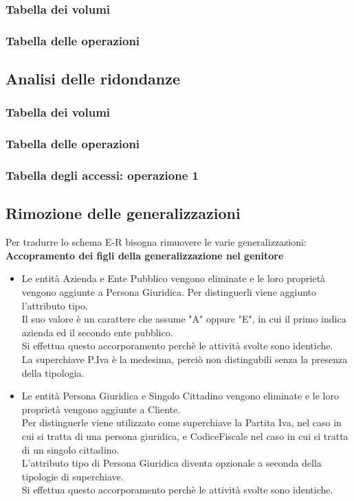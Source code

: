 \documentclass[legalpaper]{article}
\begin{document}
\subsubsection{Tabella dei volumi}
\subsubsection{Tabella delle operazioni}


\subsection{Analisi delle ridondanze}
\subsubsection{Tabella dei volumi}
\subsubsection{Tabella delle operazioni}
\subsubsection{Tabella degli accessi: operazione 1}

\subsection{Rimozione delle generalizzazioni}
Per tradurre lo schema E-R bisogna rimuovere le varie generalizzazioni:\\
\newline
\textbf{Accopramento dei figli della generalizzazione nel genitore}
\begin{itemize}
	\item Le entità Azienda e Ente Pubblico vengono eliminate e le loro proprietà vengono aggiunte a Persona Giuridica. Per distinguerli viene aggiunto l'attributo tipo. \\Il suo valore è un carattere che assume "A" oppure "E", in cui il primo indica azienda ed il secondo ente pubblico.\\
	Si effettua questo accorporamento perchè le attività svolte sono identiche. \\La superchiave P.Iva è la medesima, perciò non distingubili senza la presenza della tipologia.
	\item Le entità Persona Giuridica e Singolo Cittadino vengono eliminate e le loro proprietà vengono aggiunte a Cliente. \\Per distinguerle viene utilizzato come superchiave la Partita Iva, nel caso in cui si tratta di una persona giuridica, e CodiceFiscale nel caso in cui si tratta di un singolo cittadino.\\ L'attributo tipo di Persona Giuridica diventa opzionale a seconda della tipologie di superchiave.\\
	Si effettua questo accorporamento perchè le attività svolte sono identiche.
\end{itemize}
\end{document}
